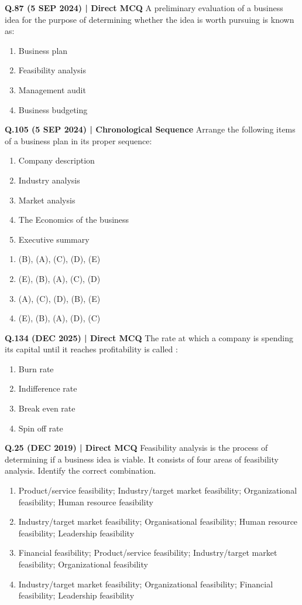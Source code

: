 \documentclass{article}
\begin{document}
\textbf{Q.87 (5 SEP 2024) | Direct MCQ}
A preliminary evaluation of a business idea for the purpose of determining whether the idea is worth pursuing is known as:
\begin{enumerate}[label=(\arabic*)]
    \item Business plan
    \item Feasibility analysis
    \item Management audit
    \item Business budgeting
\end{enumerate}

\textbf{Q.105 (5 SEP 2024) | Chronological Sequence}
Arrange the following items of a business plan in its proper sequence:
\begin{enumerate}[label=\Alph*.]
    \item Company description
    \item Industry analysis
    \item Market analysis
    \item The Economics of the business
    \item Executive summary
\end{enumerate}
\begin{enumerate}[label=(\arabic*)]
    \item (B), (A), (C), (D), (E)
    \item (E), (B), (A), (C), (D)
    \item (A), (C), (D), (B), (E)
    \item (E), (B), (A), (D), (C)
\end{enumerate}

\textbf{Q.134 (DEC 2025) | Direct MCQ}
The rate at which a company is spending its capital until it reaches profitability is called :
\begin{enumerate}[label=(\arabic*)]
    \item Burn rate
    \item Indifference rate
    \item Break even rate
    \item Spin off rate
\end{enumerate}

\textbf{Q.25 (DEC 2019) | Direct MCQ}
Feasibility analysis is the process of determining if a business idea is viable. It consists of four areas of feasibility analysis. Identify the correct combination.
\begin{enumerate}[label=(\arabic*)]
    \item Product/service feasibility; Industry/target market feasibility; Organizational feasibility; Human resource feasibility
    \item Industry/target market feasibility; Organisational feasibility; Human resource feasibility; Leadership feasibility
    \item Financial feasibility; Product/service feasibility; Industry/target market feasibility; Organizational feasibility
    \item Industry/target market feasibility; Organizational feasibility; Financial feasibility; Leadership feasibility
\end{enumerate}
\end{document}
